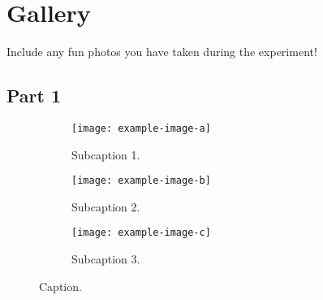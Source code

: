 \setlength{\parindent}{0pt} 

\section{Gallery}\label{appendix:A}
Include any fun photos you have taken during the experiment!
\subsection{Part 1}

\begin{figure}[!ht]
\centering
\begin{subfigure}[c]{0.45\textwidth}
    \texttt{[image: example-image-a]}
    \caption{Subcaption 1.}
    \label{fig:A.2a}
\end{subfigure}
\hfill
\begin{subfigure}[c]{0.45\textwidth}
    \texttt{[image: example-image-b]}
    \caption{Subcaption 2.}
    \label{fig:A.2b}
\end{subfigure}

\vspace{1ex}

\begin{subfigure}[c]{0.45\textwidth}
    \texttt{[image: example-image-c]}
    \caption{Subcaption 3.}
    \label{fig:A.2c}
\end{subfigure}
    
\caption{Caption.}
\label{fig:A.1}
\end{figure}

\newpage